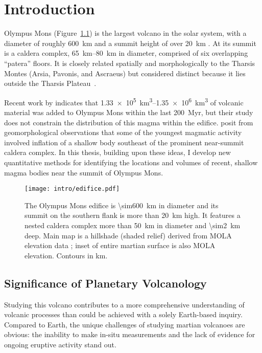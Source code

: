 \chapter{Introduction}\label{cha:intro}

Olympus Mons (Figure~\ref{fig:edifice}) is the largest volcano in the solar system, with a diameter of roughly \qty{600}{\km} and a summit height of over \qty{20}{\km} \parencite[e.g.,][]{plescia_morphometric_2004}. At its summit is a caldera complex, \qtyrange{65}{80}{\km} in diameter, comprised of six overlapping ``patera'' floors. It is closely related spatially and morphologically to the Tharsis Montes (Arsia, Pavonis, and Ascraeus) but considered distinct because it lies outside the Tharsis Plateau~\parencite[e.g.,][]{carr_volcanism_1973}.

Recent work by \textcite{chadwick_late_2015} indicates that \qtyrange{1.33e5}{1.35e6}{\km\cubed} of volcanic material was added to Olympus Mons within the last \qty{200}{Myr}, but their study does not constrain the distribution of this magma within the edifice. \textcite{mouginis-mark_late-stage_2019} posit from geomorphological observations that some of the youngest magmatic activity involved inflation of a shallow body southeast of the prominent near-summit caldera complex. In this thesis, building upon these ideas, I develop new quantitative methods for identifying the locations and volumes of recent, shallow magma bodies near the summit of Olympus Mons.

\begin{figure}
    \centering
    \texttt{[image: intro/edifice.pdf]}
    \caption[Olympus Mons]{The Olympus Mons edifice is \qty{\sim600}{\km} in diameter and its summit on the southern flank is more than \qty{20}{\km} high. It features a nested caldera complex more than \qty{50}{\km} in diameter and \qty{\sim2}{\km} deep. Main map is a hillshade (shaded relief) derived from \acf{MOLA} elevation data \parencite{smith_mars_2001}; inset of entire martian surface is also \acs{MOLA} elevation. Contours in \unit{\km}.}\label{fig:edifice}
\end{figure}

\section{Significance of Planetary Volcanology}

Studying this volcano contributes to a more comprehensive understanding of volcanic processes than could be achieved with a solely Earth-based inquiry. Compared to Earth, the unique challenges of studying martian volcanoes are obvious: the inability to make in-situ measurements and the lack of evidence for ongoing eruptive activity stand out. 

